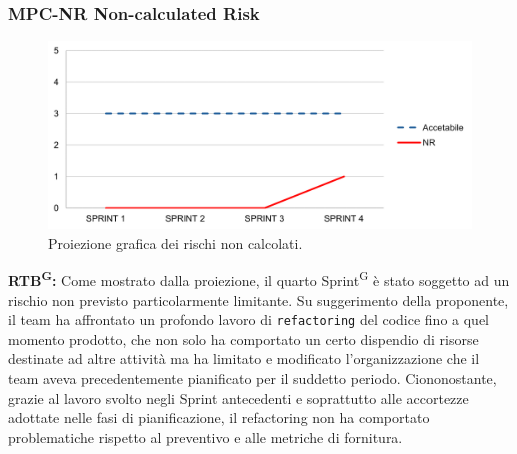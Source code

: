 \documentclass[8pt]{article}
\newcommand{\glossterm}[1]{#1\textsuperscript{G}} %
\begin{document}
\subsubsection{MPC-NR Non-calculated Risk}
\begin{figure}[h!]
    \centering
    \includegraphics[width=1\textwidth]{images/NR.png}
    \caption{Proiezione grafica dei rischi non calcolati.}
    \label{fig:Proiezione grafica dei rischi non calcolati}
\end{figure}
\textbf{\glossterm{RTB}:} Come mostrato dalla proiezione, il quarto \glossterm{Sprint} è stato soggetto ad un rischio non previsto particolarmente limitante. Su suggerimento della proponente, il team ha affrontato un profondo lavoro di \verb|refactoring| del codice fino a quel momento prodotto, che non solo ha comportato un certo dispendio di risorse destinate ad altre attività ma ha limitato e modificato l'organizzazione che il team aveva precedentemente pianificato per il suddetto periodo. Ciononostante, grazie al lavoro svolto negli Sprint antecedenti e soprattutto alle accortezze adottate nelle fasi di pianificazione, il refactoring non ha comportato problematiche rispetto al preventivo e alle metriche di fornitura.
\end{document}
